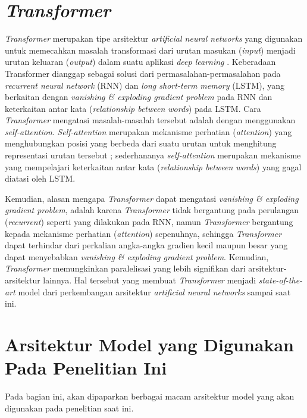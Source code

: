\section{\emph{Transformer}}
\emph{Transformer} merupakan tipe arsitektur \emph{artificial neural networks} yang digunakan untuk memecahkan masalah transformasi dari urutan masukan (\emph{input}) menjadi urutan keluaran (\emph{output}) dalam suatu aplikasi \emph{deep learning} \citep{transformers-self-attention-to-the-rescue}. Keberadaan Transformer dianggap sebagai solusi dari permasalahan-permasalahan pada \emph{recurrent neural network} (RNN) dan \emph{long short-term memory} (LSTM), yang berkaitan dengan \emph{vanishing \& exploding gradient problem} pada RNN dan keterkaitan antar kata (\emph{relationship between words}) pada LSTM. Cara \emph{Transformer} mengatasi masalah-masalah tersebut adalah dengan menggunakan \emph{self-attention}. \emph{Self-attention} merupakan mekanisme perhatian (\emph{attention}) yang menghubungkan posisi yang berbeda dari suatu urutan untuk menghitung representasi urutan tersebut \citep{DBLP:journals/corr/VaswaniSPUJGKP17}; sederhananya \emph{self-attention} merupakan mekanisme yang mempelajari keterkaitan antar kata (\emph{relationship between words}) yang gagal diatasi oleh LSTM. 

Kemudian, alasan mengapa \emph{Transformer} dapat mengatasi \emph{vanishing \& exploding gradient problem}, adalah karena \emph{Transformer} tidak bergantung pada perulangan (\emph{recurrent}) seperti yang dilakukan pada RNN, namun \emph{Transformer} bergantung kepada mekanisme perhatian (\emph{attention}) sepenuhnya, sehingga \emph{Transformer} dapat terhindar dari perkalian angka-angka gradien kecil maupun besar yang dapat menyebabkan \emph{vanishing \& exploding gradient problem}. Kemudian, \emph{Transformer} memungkinkan paralelisasi yang lebih signifikan dari arsitektur-arsitektur lainnya. Hal tersebut yang membuat \emph{Transformer} menjadi \emph{state-of-the-art} model dari perkembangan arsitektur \emph{artificial neural networks} sampai saat ini.

\section{Arsitektur Model yang Digunakan Pada Penelitian Ini}
Pada bagian ini, akan dipaparkan berbagai macam arsitektur model yang akan digunakan pada penelitian saat ini.

